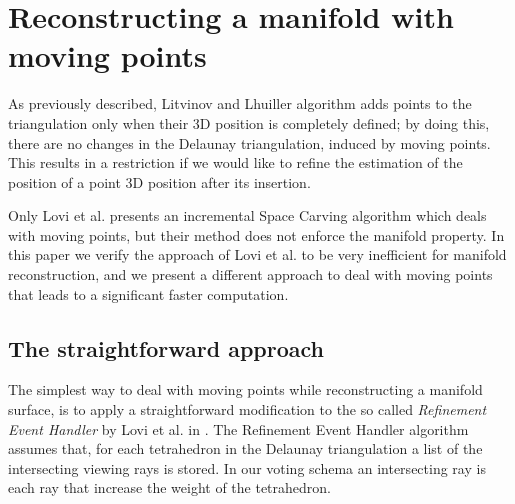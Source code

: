 % 

\section{Reconstructing a manifold with moving points}
\label{sec:3D-Reconstruction_2}
As previously described, Litvinov and Lhuiller \cite{litvinov_lhuillier_13} algorithm adds points to the triangulation only when their 3D position is completely defined; by doing this, there are no changes in the Delaunay triangulation, induced by moving points. This  results in a restriction if we would like to refine the estimation of the position of a point 3D position after its insertion.

Only Lovi et al. \cite{lovi_et_al_11} presents an incremental Space Carving algorithm which deals with moving points, but their method does not enforce the manifold property.
In this paper we verify the approach of Lovi et al. \cite{lovi_et_al_11} to be very inefficient for manifold reconstruction, and we present a different approach to deal with moving points that leads to a significant faster computation.


\subsection{The straightforward approach}
\label{subsec:straightforward_way}
The simplest way to deal with moving points while reconstructing a manifold surface, is to apply a straightforward modification to the so called \emph{Refinement Event Handler} by Lovi et al. in \cite{lovi_et_al_11}.
The Refinement Event Handler algorithm assumes that, for each tetrahedron in the Delaunay triangulation a list of the intersecting viewing rays is stored. In our voting schema an intersecting ray is each ray that increase the weight of the tetrahedron. 

